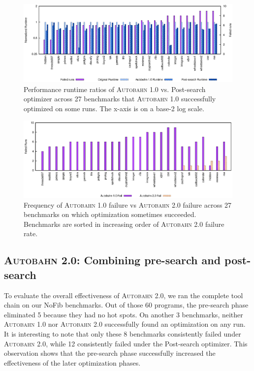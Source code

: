 \documentclass[format=sigplan, review=true]{acmart}
\newcommand{\hotspots}[0]{hot spots}
\newcommand{\Ao}[0]{\textsc{Autobahn 1.0}}
\newcommand{\At}[0]{\textsc{Autobahn 2.0}}
\newcommand{\preopt}[0]{pre-search}
\newcommand{\postopt}[0]{post-search}
\newcommand{\Postopt}[0]{Post-search}
\begin{document}
\begin{figure}
\includegraphics[width=\textwidth]{ap-partial}
\caption{Performance runtime ratios of \Ao{} vs. \Postopt{} optimizer
across 27 benchmarks that \Ao{} successfully optimized on some runs.
The x-axis is on a base-2 log scale.
}
\label{fig:post-ratio-some}
\end{figure}

\begin{figure}
\includegraphics[width=\textwidth]{aut-post-fail}
\caption{Frequency of \Ao{} failure vs \At{} failure across 27
benchmarks on which optimization sometimes succeeded. Benchmarks are sorted in
increasing order of \At{} failure rate. } 
\label{fig:post-failures}
\end{figure}

\subsection{\At{}: Combining \preopt{} and \postopt{}}

To evaluate the overall effectiveness of \At{}, we ran the complete
tool chain on our NoFib benchmarks. Out of those 60
programs, the \preopt{} phase eliminated 5 because they had
no \hotspots{}.  On another 3 benchmarks, neither \Ao{} nor \At{} 
successfully found an optimization on any run. 
It is interesting to note that only these 8
benchmarks consistently failed under \At{}, while 12
consistently failed under the \Postopt{} optimizer. 
This observation shows that the \preopt{} phase successfully
increased the effectiveness of the later optimization phases. 
\end{document}
